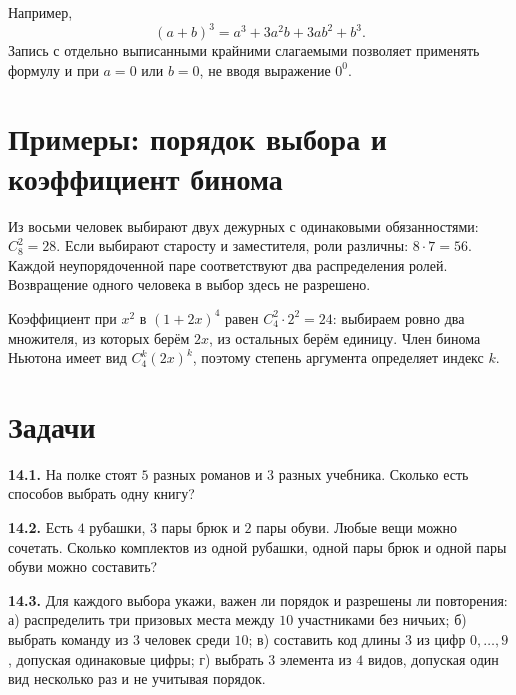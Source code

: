 Например,
\[
(a+b)^3=a^3+3a^2b+3ab^2+b^3.
\]
Запись с отдельно выписанными крайними слагаемыми позволяет применять формулу
и при \(a=0\) или \(b=0\), не вводя выражение \(0^0\).

\section{Примеры: порядок выбора и коэффициент бинома}
\begin{example}Из восьми человек выбирают двух дежурных с одинаковыми обязанностями: \(C_8^2=28\). Если выбирают старосту и заместителя, роли различны: \(8\cdot7=56\). Каждой неупорядоченной паре соответствуют два распределения ролей. Возвращение одного человека в выбор здесь не разрешено.\end{example}
\begin{example}Коэффициент при \(x^2\) в \((1+2x)^4\) равен \(C_4^2\cdot2^2=24\): выбираем ровно два множителя, из которых берём \(2x\), из остальных берём единицу. Член бинома Ньютона имеет вид \(C_4^k(2x)^k\), поэтому степень аргумента определяет индекс \(k\).\end{example}
\section*{Задачи}
\begingroup\setlength{\parskip}{2pt}
\noindent\begin{minipage}[t]{\linewidth}\textbf{14.1.} На полке стоят \(5\) разных романов и \(3\) разных учебника. Сколько есть способов выбрать одну книгу?\par\end{minipage}\par
\noindent\begin{minipage}[t]{\linewidth}\textbf{14.2.} Есть \(4\) рубашки, \(3\) пары брюк и \(2\) пары обуви. Любые вещи можно сочетать. Сколько комплектов из одной рубашки, одной пары брюк и одной пары обуви можно составить?\par\end{minipage}\par
\noindent\begin{minipage}[t]{\linewidth}\textbf{14.3.} Для каждого выбора укажи, важен ли порядок и разрешены ли повторения: а) распределить три призовых места между \(10\) участниками без ничьих; б) выбрать команду из \(3\) человек среди \(10\); в) составить код длины \(3\) из цифр \(0,\ldots,9\), допуская одинаковые цифры; г) выбрать \(3\) элемента из \(4\) видов, допуская один вид несколько раз и не учитывая порядок.\par\end{minipage}\par
